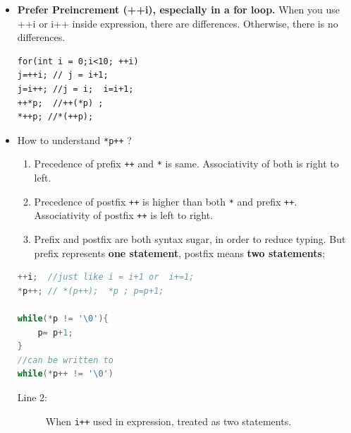 \documentclass[a4paper,11pt,twoside]{book}
\begin{document}
\begin{itemize}
	\item \textbf{Prefer Preincrement (++i), especially in a for loop.}  When you use ++i or i++ inside expression, there are differences. Otherwise, there is no differences.
	
\begin{lstlisting}[numbers=none]
for(int i = 0;i<10; ++i)
j=++i; // j = i+1;
j=i++; //j = i;  i=i+1;
++*p;  //++(*p) ;
*++p; //*(++p);
\end{lstlisting}
	
	\item How to understand \texttt{*p++} ?
	
	\begin{enumerate}
		\item Precedence of prefix \texttt{++} and \texttt{*} is same. Associativity of both is right to left.
		\item Precedence of postfix \texttt{++} is higher than both \texttt{*} and prefix \texttt{++}. Associativity of postfix \texttt{++} is left to right.
		\item Prefix and postfix are both syntax sugar, in order to reduce typing.   But prefix represents \textbf{one statement}, postfix means \textbf{two statements};
	\end{enumerate}
	
\begin{lstlisting}[frame=single, language=c++]
++i;  //just like i = i+1 or  i+=1;
*p++; // *(p++);  *p ; p=p+1;

while(*p != '\0'){
	p= p+1;
}
//can be written to
while(*p++ != '\0')
\end{lstlisting}

\begin{description}
	\item[Line 2:] When \texttt{i++} used in expression, treated as two statements.
\end{description}

\end{itemize}
\end{document}
